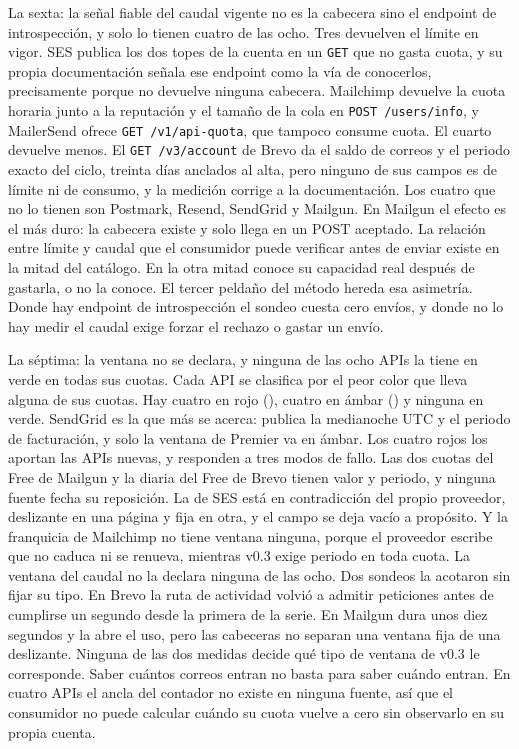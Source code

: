 La sexta: la señal fiable del caudal vigente no es la cabecera sino el endpoint de introspección, y solo lo tienen cuatro de las ocho.
Tres devuelven el límite en vigor.
SES publica los dos topes de la cuenta en un \texttt{GET} que no gasta cuota, y su propia documentación señala ese endpoint como la vía de conocerlos, precisamente porque no devuelve ninguna cabecera.
Mailchimp devuelve la cuota horaria junto a la reputación y el tamaño de la cola en \texttt{POST /users/info}, y MailerSend ofrece \texttt{GET /v1/api-quota}, que tampoco consume cuota.
El cuarto devuelve menos.
El \texttt{GET /v3/account} de Brevo da el saldo de correos y el periodo exacto del ciclo, treinta días anclados al alta, pero ninguno de sus campos es de límite ni de consumo, y la medición corrige a la documentación.
Los cuatro que no lo tienen son Postmark, Resend, SendGrid y Mailgun.
En Mailgun el efecto es el más duro: la cabecera existe y solo llega en un POST aceptado.
La relación entre límite y caudal que el consumidor puede verificar antes de enviar existe en la mitad del catálogo.
En la otra mitad conoce su capacidad real después de gastarla, o no la conoce.
El tercer peldaño del método hereda esa asimetría. Donde hay endpoint de introspección el sondeo cuesta cero envíos, y donde no lo hay medir el caudal exige forzar el rechazo o gastar un envío.

La séptima: la ventana no se declara, y ninguna de las ocho APIs la tiene en verde en todas sus cuotas.
Cada API se clasifica por el peor color que lleva alguna de sus cuotas.
Hay cuatro en rojo (\semrojo{}), cuatro en ámbar (\semambar{}) y ninguna en verde. SendGrid es la que más se acerca: publica la medianoche UTC y el periodo de facturación, y solo la ventana de Premier va en ámbar.
Los cuatro rojos los aportan las APIs nuevas, y responden a tres modos de fallo.
Las dos cuotas del Free de Mailgun y la diaria del Free de Brevo tienen valor y periodo, y ninguna fuente fecha su reposición.
La de SES está en contradicción del propio proveedor, deslizante en una página y fija en otra, y el campo se deja vacío a propósito.
Y la franquicia de Mailchimp no tiene ventana ninguna, porque el proveedor escribe que no caduca ni se renueva, mientras v0.3 exige periodo en toda cuota.
La ventana del caudal no la declara ninguna de las ocho.
Dos sondeos la acotaron sin fijar su tipo. En Brevo la ruta de actividad volvió a admitir peticiones antes de cumplirse un segundo desde la primera de la serie. En Mailgun dura unos diez segundos y la abre el uso, pero las cabeceras no separan una ventana fija de una deslizante.
Ninguna de las dos medidas decide qué tipo de ventana de v0.3 le corresponde.
Saber cuántos correos entran no basta para saber cuándo entran.
En cuatro APIs el ancla del contador no existe en ninguna fuente, así que el consumidor no puede calcular cuándo su cuota vuelve a cero sin observarlo en su propia cuenta.

